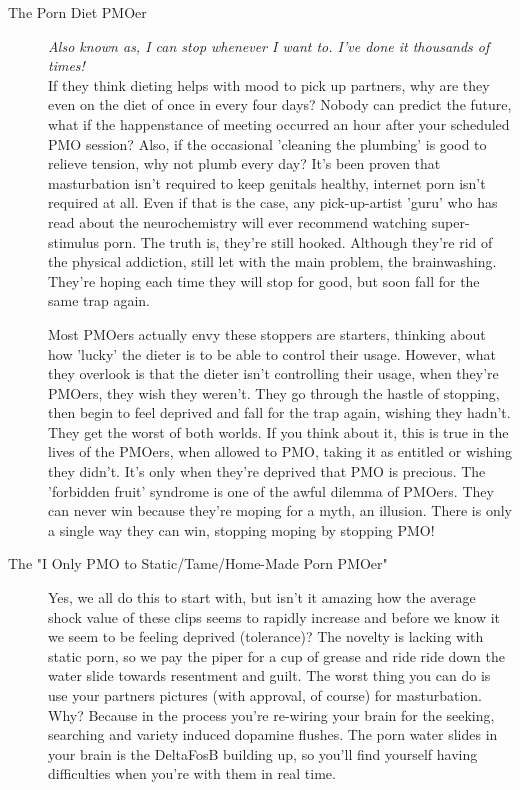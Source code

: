 \documentclass[easypeasy]{subfiles}
\begin{document}
\begin{description}
    \item [The Porn Diet PMOer] \textit{Also known as, I can stop whenever I want to. I've done it thousands of times!}\\ If they think dieting helps with mood to pick up partners, why are they even on the diet of once in every four days? Nobody can predict the future, what if the happenstance of meeting occurred an hour after your scheduled PMO session? Also, if the occasional 'cleaning the plumbing' is good to relieve tension, why not plumb every day? It's been proven that masturbation isn't required to keep genitals healthy, internet porn isn't required at all. Even if that is the case, any pick-up-artist 'guru' who has read about the neurochemistry will ever recommend watching super-stimulus porn. The truth is, they're still hooked. Although they're rid of the physical addiction, still let with the main problem, the brainwashing. They're hoping each time they will stop for good, but soon fall for the same trap again.

  Most PMOers actually envy these stoppers are starters, thinking about how 'lucky' the dieter is to be able to control their usage. However, what they overlook is that the dieter isn't controlling their usage, when they're PMOers, they wish they weren't. They go through the hastle of stopping, then begin to feel deprived and fall for the trap again, wishing they hadn't. They get the worst of both worlds. If you think about it, this is true in the lives of the PMOers, when allowed to PMO, taking it as entitled or wishing they didn't. It's only when they're deprived that PMO is precious. The 'forbidden fruit' syndrome is one of the awful dilemma of PMOers. They can never win because they're moping for a myth, an illusion. There is only a single way they can win, stopping moping by stopping PMO!

\item [The "I Only PMO to Static/Tame/Home-Made Porn PMOer"] Yes, we all do this to start with, but isn't it amazing how the average shock value of these clips seems to rapidly increase and before we know it we seem to be feeling deprived (tolerance)? The novelty is lacking with static porn, so we pay the piper for a cup of grease and ride ride down the water slide towards resentment and guilt. The worst thing you can do is use your partners pictures (with approval, of course) for masturbation. Why? Because in the process you're re-wiring your brain for the seeking, searching and variety induced dopamine flushes. The porn water slides in your brain is the DeltaFosB building up, so you'll find yourself having difficulties when you're with them in real time.


\end{description}
\end{document}
